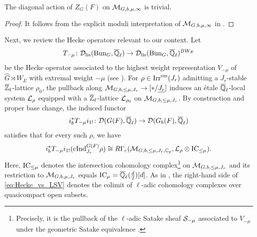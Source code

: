 \documentclass[12pt,reqno]{amsart}
\begin{document}
\begin{lem} \label{lem:diagonal_central_action}
    The diagonal action of $Z_G(F)$ on ${\mathcal{M}}_{G, b, \mu, \infty}$ is trivial. 
\end{lem}
\begin{proof}
    It follows from the explicit moduli interpretation of ${\mathcal{M}}_{G, b, \mu, \infty}$ in \cite[p.219]{SW20}. 
\end{proof}

Next, we review the Hecke operators relevant to our context. Let 
\[
    T_{-\mu} \colon {\mathcal{D}}_{\operatorname{lis}}({\operatorname{Bun}}_G, {\overline{\mathbb{Q}}_\ell}) \to {\mathcal{D}}_{\operatorname{lis}}({\operatorname{Bun}}_G, {\overline{\mathbb{Q}}_\ell})^{BW_E}
\]
be the Hecke operator associated to the highest weight representation $V_{-\mu}$ of $\widehat{G} \rtimes W_E$ with extremal weight $-\mu$ (see \cite[Proposition IX.2.1]{FS24}). For $\rho \in {\operatorname{Irr}}^{\operatorname{sm}}(J_r)$ admitting a $J_r$-stable $\mathbb{{\overline{Z}}}_\ell$-lattice $\rho_0$, the pullback along ${\mathcal{M}}_{G, b, \leq \mu, J_r} \to [\ast / {\underline{J_r}}]$ induces an \'{e}tale ${\overline{\mathbb{Q}}_\ell}$-local system ${\mathcal{L}}_\rho$ equipped with a $\mathbb{{\overline{Z}}}_\ell$-lattice ${\mathcal{L}}_{\rho_0}$ on ${\mathcal{M}}_{G, b, \leq \mu, J_r}$. By construction and proper base change, the induced functor 
\[
    i_b^* T_{-\mu} i_{1!} \colon {\mathcal{D}}(G(F), {\overline{\mathbb{Q}}_\ell}) \to {\mathcal{D}}(G_b(F), {\overline{\mathbb{Q}}_\ell})
\]
satisfies that for every such $\rho$, we have 
\begin{equation} \label{eq:Hecke_vs_LSV}
    i_b^* T_{-\mu} i_{1!}({\operatorname{cInd}}_{J_r}^{G(F)} \rho) \cong R\Gamma_c({\mathcal{M}}_{G, b, \leq \mu, J_r, \mathbb{C}_p}, {\mathcal{L}}_\rho \otimes {\operatorname{IC}}_{\leq \mu}). 
\end{equation}
Here, ${\operatorname{IC}}_{\leq \mu}$ denotes the intersection cohomology complex\footnote{Precisely, it is the pullback of the $\ell$-adic Satake sheaf ${\mathcal{S}}_{-\mu}$ associated to $V_{-\mu}$ under the geometric Satake equivalence \cite[Chapter VI]{FS24}.} on ${\mathcal{M}}_{G, b, \leq \mu, J_r}$ and its restriction to ${\mathcal{M}}_{G, b, \mu, J_r}$ equals ${\operatorname{IC}}_\mu = {\overline{\mathbb{Q}}_\ell}(\tfrac{d}{2})[d]$. As in \cite[{}IX.3]{FS24}, the right-hand side of \eqref{eq:Hecke_vs_LSV} denotes the colimit of $\ell$-adic cohomology complexes over quasicompact open subsets. %
\end{document}
